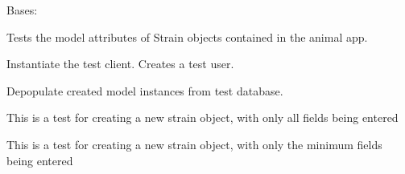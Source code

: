 \documentclass[letterpaper,10pt,english]{sphinxmanual}
\begin{document}

\begin{fulllineitems}
\label{api:mousedb.animal.tests.StrainModelTests}
Bases: 

Tests the model attributes of Strain objects contained in the animal app.


\begin{fulllineitems}
\label{api:mousedb.animal.tests.StrainModelTests.setUp}
Instantiate the test client.  Creates a test user.

\end{fulllineitems}



\begin{fulllineitems}
\label{api:mousedb.animal.tests.StrainModelTests.tearDown}
Depopulate created model instances from test database.

\end{fulllineitems}



\begin{fulllineitems}
\label{api:mousedb.animal.tests.StrainModelTests.test_create_strain_all}
This is a test for creating a new strain object, with only all fields being entered

\end{fulllineitems}



\begin{fulllineitems}
\label{api:mousedb.animal.tests.StrainModelTests.test_create_strain_minimal}
This is a test for creating a new strain object, with only the minimum fields being entered

\end{fulllineitems}



\end{fulllineitems}
\end{document}
